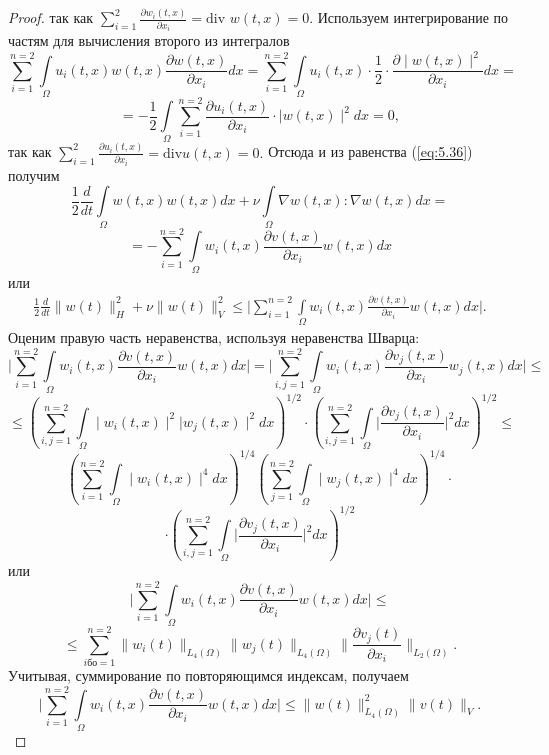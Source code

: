 \begin{proof}
    так как $\sum\limits_{i=1}^{2}\frac{\partial w_i(t, x)}{\partial x_i} = \textrm{div } w(t, x)=0$. Используем интегрирование по частям для вычисления второго из интегралов
    $$\sum_{i=1}^{n=2}\int\limits_\Omega u_i(t,x)w(t, x)\frac{\partial w(t, x)}{\partial x_i}dx=
    \sum_{i=1}^{n=2}\int\limits_\Omega u_i(t,x)\cdot\frac{1}{2}\cdot\frac{\partial \mid w(t, x)\mid^2}{\partial x_i}dx=$$
    $$=-\frac{1}{2}\int\limits_\Omega\sum_{i=1}^{n=2}\frac{\partial u_i(t, x)}{\partial x_i}\cdot\mid w(t, x)\mid^2dx=0,$$
    так как $\sum\limits_{i=1}^{2}\frac{\partial u_i(t, x)}{\partial x_i} = \textrm{div} u(t, x)=0.$
    Отсюда и из равенства (\ref{eq:5.36}) получим
    $$\frac{1}{2}\frac{d}{dt}\int\limits_\Omega w(t, x)w(t, x)dx+\nu\int\limits_{\Omega}\nabla w(t,x):\nabla w(t,x)dx=$$
    $$=-\sum_{i=1}^{n=2}\int\limits_\Omega w_i(t, x)\frac{\partial v(t, x)}{\partial x_i}w(t, x)dx$$
    или
    \begin{equation}\label{eq:5.37}
        \begin{gathered}
            \frac{1}{2}\frac{d}{dt}\| w(t)\|_H^2+\nu\| w(t)\|_V^2\le
            \bigg|\sum_{i=1}^{n=2}\int\limits_\Omega w_i(t, x)\frac{\partial v(t, x)}{\partial x_i}w(t, x)dx\bigg|.
        \end{gathered}
    \end{equation}
    Оценим правую часть неравенства, используя неравенства Шварца:
    $$\bigg|\sum_{i=1}^{n=2}\int\limits_\Omega w_i(t, x)\frac{\partial v(t, x)}{\partial x_i}w(t, x)dx\bigg|=
    \bigg|\sum_{i,j=1}^{n=2}\int\limits_\Omega w_i(t, x)\frac{\partial v_j(t, x)}{\partial x_i}w_j(t, x)dx\bigg|\le$$
    $$\le\left(\sum_{i,j=1}^{n=2}\int\limits_\Omega \mid w_i(t, x)\mid^2|w_j(t, x)\mid^2dx \right)^{1/2}
    \cdot\left(\sum_{i,j=1}^{n=2}\int\limits_\Omega\bigg|\frac{\partial v_j(t, x)}{\partial x_i}\bigg|^2dx \right)^{1/2}\le$$
    $$\left(\sum_{i=1}^{n=2}\int\limits_\Omega \mid w_i(t, x)\mid^4dx\right)^{1/4}\left(\sum_{j=1}^{n=2}\int\limits_\Omega \mid w_j(t, x)\mid^4dx\right)^{1/4}\cdot$$
    $$\cdot\left(\sum_{i,j=1}^{n=2}\int\limits_\Omega\bigg|\frac{\partial v_j(t, x)}{\partial x_i} \bigg|^2dx \right)^{1/2}$$
    или
    $$\bigg|\sum_{i=1}^{n=2}\int\limits_\Omega w_i(t, x)\frac{\partial v(t, x)}{\partial x_i}w(t, x)dx\bigg|\le$$
    $$\le\sum_{iбо=1}^{n=2}\| w_i(t)\|_{L_4(\Omega)}\| w_j(t)\|_{L_4(\Omega)}\|\frac{\partial v_j(t)}{\partial x_i}\|_{L_2(\Omega)}.$$
    Учитывая, суммирование по повторяющимся индексам, получаем
    $$\bigg|\sum_{i=1}^{n=2}\int\limits_\Omega w_i(t, x)\frac{\partial v(t, x)}{\partial x_i}w(t, x)dx\bigg|\le\| w(t)\|_{L_4(\Omega)}^2\| v(t)\|_V.$$

\end{proof}
